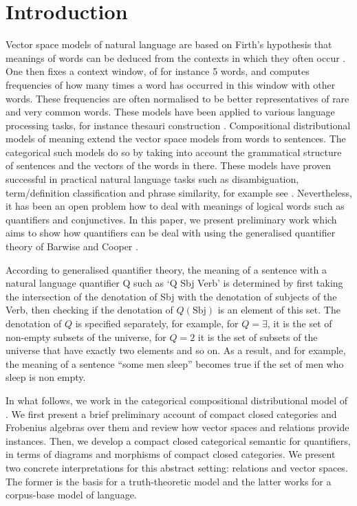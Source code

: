 \section{Introduction}

Vector space models of natural language are based on Firth's hypothesis that  meanings of words can be deduced from the contexts in which they often occur  \cite{Firth}.  One then fixes a context window, of for instance 5 words, and computes frequencies of how many times a word has occurred in this window with other words. These frequencies are often normalised to be better representatives of rare and very common words. These models have been applied to various language processing tasks, for instance thesauri construction \cite{Curran}.  Compositional distributional models of meaning extend the vector space models from words to sentences. The categorical such models \cite{Coeckeetal,BaroniZam} do so by taking into account the grammatical structure of sentences and the vectors of the words in there.  These models have proven successful in practical natural language tasks such as disambiguation, term/definition classification and phrase similarity, for example see \cite{GrefenSadr,kartsaklis2012}. Nevertheless, it has been an open problem how to deal  with  meanings of logical words such as  quantifiers and conjunctives. In this paper, we present preliminary work which aims to show how quantifiers can be deal with using the generalised quantifier  theory  of Barwise and Cooper \cite{BarwiseCooper81}. 

According to  generalised quantifier theory, the meaning of a sentence with a natural language  quantifier Q such as  `Q Sbj Verb' is determined by first taking the intersection of the denotation of Sbj with the denotation of subjects of the Verb, then checking if the denotation of $Q(\text{Sbj})$ is an element of this set. The denotation of $Q$ is specified separately, for example, for $Q = \exists$, it is the set of non-empty subsets of the universe, for $Q = 2$ it is  the set of  subsets of the universe that have exactly two elements and so on. As a result, and for example, the meaning of a sentence ``some men sleep'' becomes  true if the set of men who sleep is non empty. 


In what follows,  we work in the categorical compositional distributional model of \cite{Coeckeetal}. We  first present  a brief preliminary account of compact closed categories and Frobenius algebras over them and review  how vector spaces and relations provide instances. Then, we develop a compact closed categorical semantic for quantifiers, in terms of diagrams and morphisms of compact closed categories. We present two concrete interpretations for this abstract setting: relations and vector spaces. The former is the basis for  a truth-theoretic model and the latter works for a corpus-base model of language. 


